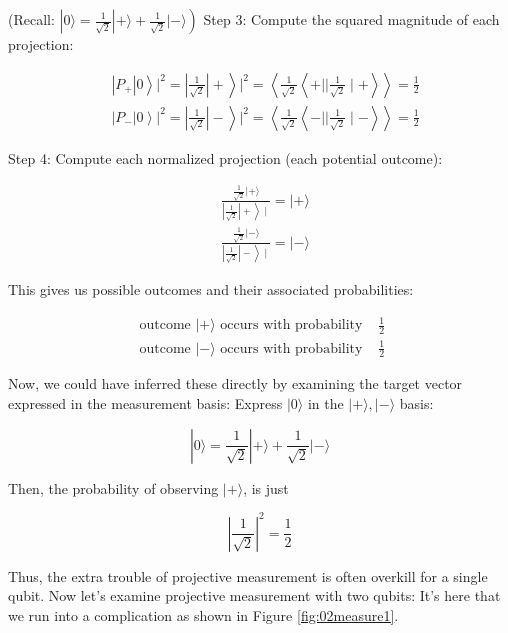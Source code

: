 \documentclass[main.tex]{subfiles}
\begin{document}
    (Recall: $\left.|0\rangle=\frac{1}{\sqrt{2}}|+\rangle+\frac{1}{\sqrt{2}}|-\rangle\right)$ Step 3: Compute the squared magnitude of each projection:
    
    $$
    \begin{aligned}
    &\left.\left.\left|P_{+}\right| 0\right\rangle\left.\right|^{2}=\left|\frac{1}{\sqrt{2}}\right|+\right\rangle\left.\right|^{2}=\left\langle\frac{1}{\sqrt{2}}\left\langle+|| \frac{1}{\sqrt{2}} \mid+\right\rangle\right\rangle=\frac{1}{2} \\
    &\left.\left.\left|P_{-}\right| 0\right\rangle\left.\right|^{2}=\left|\frac{1}{\sqrt{2}}\right|-\right\rangle\left.\right|^{2}=\left\langle\frac{1}{\sqrt{2}}\left\langle-|| \frac{1}{\sqrt{2}} \mid-\right\rangle\right\rangle=\frac{1}{2}
    \end{aligned}
    $$
    
    Step 4: Compute each normalized projection (each potential outcome):
    
    $$
    \begin{aligned}
    &\frac{\frac{1}{\sqrt{2}}|+\rangle}{\left.\left|\frac{1}{\sqrt{2}}\right|+\right\rangle \mid}=|+\rangle \\
    &\frac{\frac{1}{\sqrt{2}}|-\rangle}{\left.\left|\frac{1}{\sqrt{2}}\right|-\right\rangle \mid}=|-\rangle
    \end{aligned}
    $$
    
    This gives us possible outcomes and their associated probabilities:
    
    $$
    \begin{array}{ll}
    \text { outcome }|+\rangle \text { occurs with probability } & \frac{1}{2} \\
    \text { outcome }|-\rangle \text { occurs with probability } & \frac{1}{2}
    \end{array}
    $$
    
    Now, we could have inferred these directly by examining the target vector expressed in the measurement basis: Express $|0\rangle$ in the $|+\rangle,|-\rangle$ basis:
    
    $$
    |0\rangle=\frac{1}{\sqrt{2}}|+\rangle+\frac{1}{\sqrt{2}}|-\rangle
    $$
    
    Then, the probability of observing $|+\rangle$, is just
    
    $$
    \left|\frac{1}{\sqrt{2}}\right|^{2}=\frac{1}{2}
    $$
    
    Thus, the extra trouble of projective measurement is often overkill for a single qubit. Now let's examine projective measurement with two qubits: It's here that we run into a complication as shown in Figure \ref{fig:02measure1}.
\end{document}
